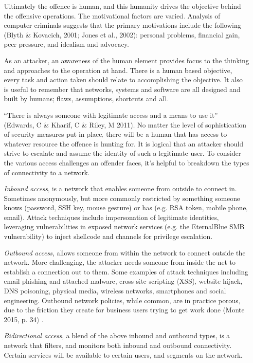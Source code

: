 \documentclass[11pt]{report}
\begin{document}
Ultimately the offence is human, and this humanity drives the objective behind the offensive operations. The motivational factors are varied. Analysis of computer criminals suggests that the primary motivations include the following (Blyth \& Kovacich, 2001; Jones et al., 2002): personal problems, financial gain, peer pressure, and idealism and advocacy.

As an attacker, an awareness of the human element provides focus to the thinking and approaches to the operation at hand. There is a human based objective, every task and action taken should relate to accomplishing the objective. It also is useful to remember that networks, systems and software are all designed and built by humans; flaws, assumptions, shortcuts and all.

``There is always someone with legitimate access and a means to use it'' (Edwards, C \& Kharif, C \& Riley, M 2011). No matter the level of sophistication of security measures put in place, there will be a human that has access to whatever resource the offence is hunting for. It is logical that an attacker should strive to escalate and assume the identity of such a legitimate user. To consider the various access challenges an offender faces, it’s helpful to breakdown the types of connectivity to a network.

\textit{Inbound access}, is a network that enables someone from outside to connect in. Sometimes anonymously, but more commonly restricted by something someone knows (password, SSH key, mouse gesture) or has (e.g. RSA token, mobile phone, email). Attack techniques include impersonation of legitimate identities, leveraging vulnerabilities in exposed network services (e.g. the EternalBlue SMB vulnerability) to inject shellcode and channels for privilege escalation.

\textit{Outbound access}, allows someone from within the network to connect outside the network. More challenging, the attacker needs someone from inside the net to establish a connection out to them. Some examples of attack techniques including email phishing and attached malware, cross site scripting (XSS), website hijack, DNS poisoning, physical media, wireless networks, smartphones and social engineering. Outbound network policies, while common, are in practice porous, due to the friction they create for business users trying to get work done (Monte 2015, p. 34) \cite{monte}.

\textit{Bidirectional access}, a blend of the above inbound and outbound types, is a network that filters, and monitors both inbound and outbound connectivity. Certain services will be available to certain users, and segments on the network.
\end{document}
